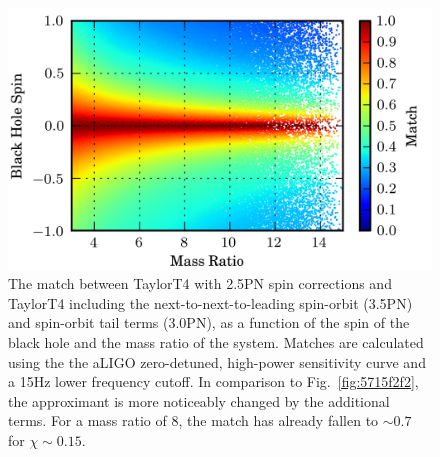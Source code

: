 \begin{figure}
\begin{center}
\includegraphics[width=1.0	\textwidth]{papers/nsbh_faithfulness/figure5.png}
\end{center}
\caption{\label{fig:5715t4t4}The match between TaylorT4  with 2.5\ac{PN} spin corrections
and TaylorT4 including the next-to-next-to-leading spin-orbit (3.5\ac{PN}) and spin-orbit tail 
terms (3.0\ac{PN}), as a function of the spin of the black hole
and the mass ratio of the system. Matches are calculated using the the aLIGO
zero-detuned, high-power sensitivity curve and a 15Hz lower frequency cutoff. 
In comparison to Fig.~\ref{fig:5715f2f2}, the approximant is more noticeably changed
by the additional terms. For a mass ratio of 8, the match has already 
fallen to  $ \sim 0.7 $ for $\chi \sim 0.15$. }
\end{figure}

